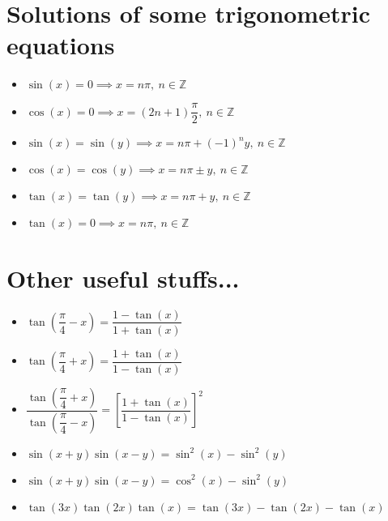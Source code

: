 \documentclass{article}
\begin{document}
\maketitle
\section{Solutions of some trigonometric equations}
\begin{itemize}
  \item $\sin(x) = 0 \implies x = n\pi,\ n \in \mathbb{Z}$
  \item $\cos(x) = 0 \implies x = (2n + 1)\dfrac{\pi}{2},\ n \in \mathbb{Z}$
  \item $\sin(x) = \sin(y) \implies x = n\pi + (-1)^n y,\ n \in \mathbb{Z}$
  \item $\cos(x) = \cos(y) \implies x = n\pi \pm y,\ n \in \mathbb{Z}$
  \item $\tan(x) = \tan(y) \implies x = n\pi + y,\ n \in \mathbb{Z}$
  \item $\tan(x) = 0 \implies x = n\pi,\ n \in \mathbb{Z}$
\end{itemize}
\maketitle
\section{Other useful stuffs...}
\begin{itemize}
  \item $\tan\left(\dfrac{\pi}{4} - x\right) = \dfrac{1 - \tan(x)}{1 + \tan(x)}$
  \item $\tan\left(\dfrac{\pi}{4} + x\right) = \dfrac{1 + \tan(x)}{1 - \tan(x)}$
  \item $\dfrac{\tan\left(\dfrac{\pi}{4} + x\right)}{\tan\left(\dfrac{\pi}{4} - x\right)} = \left[\dfrac{1 + \tan(x)}{1 - \tan(x)}\right]^2$
  \item $\sin(x + y)\sin(x - y) = \sin^2(x) - \sin^2(y)$
  \item $\sin(x + y)\sin(x - y) = \cos^2(x) - \sin^2(y)$
  \item $\tan(3x)\tan(2x)\tan(x) = \tan(3x) - \tan(2x) - \tan(x)$
\end{itemize}

\maketitle
\end{document}
